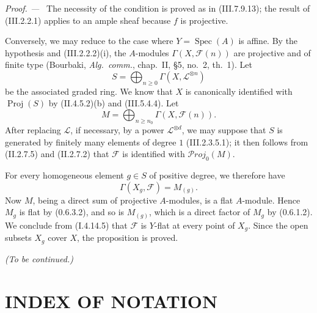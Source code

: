\documentclass[10pt,oneside]{book}
\newcommand{\sh}[1]{\mathscr{#1}}
\newcommand{\Spec}{\operatorname{Spec}}
\newcommand{\Proj}{\operatorname{Proj}}
\newcommand{\shProj}{\mathscr{P}\!roj}
\newcommand{\sref}[2][]{(#2)}
\newcommand{\oldpage}[2][]{\setcounter{footnote}{0}\marginpar{\scriptsize\textbf{#1}~|~#2}\ignorespaces}
\newenvironment{proof}{\par\medskip\noindent\textit{Proof. ---\ }}{\par}
\begin{document}
\begin{proof}
The necessity of the condition is proved as in
\sref{III.7.9.13}; the result of \sref{III.2.2.1} applies
to an ample sheaf because $f$ is projective.

Conversely, we may reduce to the case where
$Y=\Spec(A)$ is affine.  By the hypothesis and
\sref{III.2.2.2}{(i)}, the $A$-modules
$\Gamma(X,\sh{F}(n))$ are projective and of finite type
(Bourbaki, \emph{Alg.~comm.}, chap.~II, \S5, no.~2,
th.~1).  Let
\[
  S=\bigoplus_{n\geq0}\Gamma(X,\sh{L}^{\otimes n})
\]
be the associated graded ring.  We know that $X$ is
canonically identified with $\Proj(S)$ by
\sref[II]{II.4.5.2}{(b)} and \sref{III.5.4.4}.  Let
\[
  M=\bigoplus_{n\geq n_0}\Gamma(X,\sh{F}(n)).
\]
After replacing $\sh{L}$, if necessary, by a power
$\sh{L}^{\otimes d}$, we may suppose that $S$ is
generated by finitely many elements of degree $1$
\sref{III.2.3.5.1}; it then follows from
\sref[II]{II.2.7.5} and \sref[II]{II.2.7.2} that $\sh{F}$ is
identified with $\shProj_0(M)$.

For every homogeneous element $g\in S$ of positive
degree, we therefore have
\[
  \Gamma(X_g,\sh{F})=M_{(g)}.
\]
Now $M$, being a direct sum of projective $A$-modules, is
a flat $A$-module.  Hence $M_g$ is flat by
\sref[0]{0.6.3.2}, and so is $M_{(g)}$, which is a direct
factor of $M_g$ by \sref[0]{0.6.1.2}.  We conclude from
\sref[I]{I.4.14.5} that $\sh{F}$ is $Y$-flat at every
point of $X_g$.  Since the open subsets $X_g$ cover $X$,
the proposition is proved.
\end{proof}

\bigskip
\noindent\emph{(To be continued.)}

\clearpage
\oldpage[III]{213}
\section*{INDEX OF NOTATION}
\end{document}
